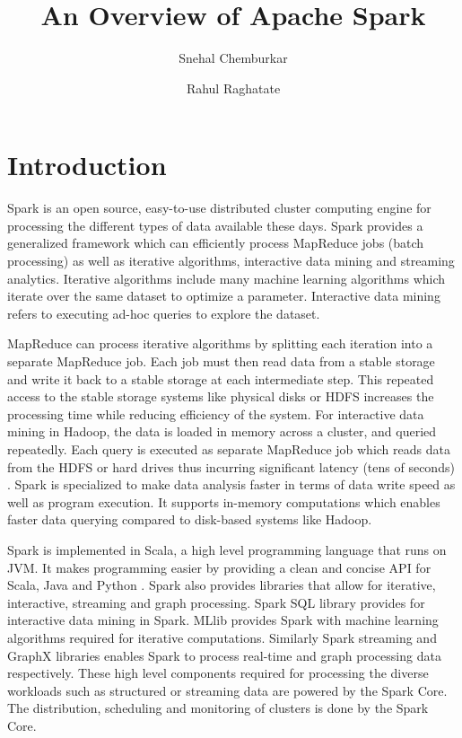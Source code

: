 \documentclass[9pt,twocolumn,twoside]{../../styles/osajnl}
\title{An Overview of Apache Spark}
\author[1]{Snehal Chemburkar}
\author[1]{Rahul Raghatate}
\affil[1]{School of Informatics and Computing, Bloomington, IN 47408,
  U.S.A.}
\affil[*]{Corresponding authors: snehchem@iu.edu, rraghtate@iu.edu}
\begin{document}
\maketitle

\section{Introduction}

Spark is an open source, easy-to-use distributed cluster computing
engine for processing the different types of data available these
days. Spark provides a generalized framework which can efficiently
process MapReduce jobs (batch processing) as well as iterative
algorithms, interactive data mining and streaming analytics. Iterative
algorithms include many machine learning algorithms which iterate over
the same dataset to optimize a parameter. Interactive data mining
refers to executing ad-hoc queries to explore the dataset.

MapReduce can process iterative algorithms by splitting each iteration
into a separate MapReduce job. Each job must then read data from a
stable storage and write it back to a stable storage at each
intermediate step. This repeated access to the stable storage systems
like physical disks or HDFS increases the processing time while
reducing efficiency of the system. For interactive data mining in
Hadoop, the data is loaded in memory across a cluster, and queried
repeatedly. Each query is executed as separate MapReduce job which
reads data from the HDFS or hard drives thus incurring significant
latency (tens of seconds) \cite{paper-zaharia}.  Spark is specialized
to make data analysis faster in terms of data write speed as well as
program execution. It supports in-memory computations which enables
faster data querying compared to disk-based systems like Hadoop.

Spark is implemented in Scala, a high level programming language that
runs on JVM. It makes programming easier by providing a clean and
concise API for Scala, Java and Python \cite{paper-zaharia}. Spark
also provides libraries that allow for iterative, interactive,
streaming and graph processing. Spark SQL library provides for
interactive data mining in Spark. MLlib provides Spark with machine
learning algorithms required for iterative computations. Similarly
Spark streaming and GraphX libraries enables Spark to process
real-time and graph processing data respectively. These high level
components required for processing the diverse workloads such as
structured or streaming data are powered by the Spark Core. The
distribution, scheduling and monitoring of clusters is done by the
Spark Core.
\end{document}
